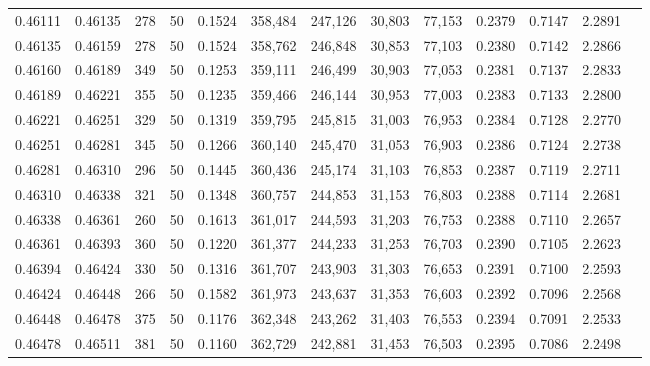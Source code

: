 \begin{tabular}{rrrrrrrrrrrrr}
0.46111 & 0.46135 &   278 &  50 &                                     0.1524 & 358,484 & 247,126 &  30,803 &  77,153 & 0.2379 & 0.7147 & 2.2891 \\
0.46135 & 0.46159 &   278 &  50 &                                     0.1524 & 358,762 & 246,848 &  30,853 &  77,103 & 0.2380 & 0.7142 & 2.2866 \\
0.46160 & 0.46189 &   349 &  50 &                                     0.1253 & 359,111 & 246,499 &  30,903 &  77,053 & 0.2381 & 0.7137 & 2.2833 \\
0.46189 & 0.46221 &   355 &  50 &                                     0.1235 & 359,466 & 246,144 &  30,953 &  77,003 & 0.2383 & 0.7133 & 2.2800 \\
0.46221 & 0.46251 &   329 &  50 &                                     0.1319 & 359,795 & 245,815 &  31,003 &  76,953 & 0.2384 & 0.7128 & 2.2770 \\
0.46251 & 0.46281 &   345 &  50 &                                     0.1266 & 360,140 & 245,470 &  31,053 &  76,903 & 0.2386 & 0.7124 & 2.2738 \\
0.46281 & 0.46310 &   296 &  50 &                                     0.1445 & 360,436 & 245,174 &  31,103 &  76,853 & 0.2387 & 0.7119 & 2.2711 \\
0.46310 & 0.46338 &   321 &  50 &                                     0.1348 & 360,757 & 244,853 &  31,153 &  76,803 & 0.2388 & 0.7114 & 2.2681 \\
0.46338 & 0.46361 &   260 &  50 &                                     0.1613 & 361,017 & 244,593 &  31,203 &  76,753 & 0.2388 & 0.7110 & 2.2657 \\
0.46361 & 0.46393 &   360 &  50 &                                     0.1220 & 361,377 & 244,233 &  31,253 &  76,703 & 0.2390 & 0.7105 & 2.2623 \\
0.46394 & 0.46424 &   330 &  50 &                                     0.1316 & 361,707 & 243,903 &  31,303 &  76,653 & 0.2391 & 0.7100 & 2.2593 \\
0.46424 & 0.46448 &   266 &  50 &                                     0.1582 & 361,973 & 243,637 &  31,353 &  76,603 & 0.2392 & 0.7096 & 2.2568 \\
0.46448 & 0.46478 &   375 &  50 &                                     0.1176 & 362,348 & 243,262 &  31,403 &  76,553 & 0.2394 & 0.7091 & 2.2533 \\
0.46478 & 0.46511 &   381 &  50 &                                     0.1160 & 362,729 & 242,881 &  31,453 &  76,503 & 0.2395 & 0.7086 & 2.2498 \\

\end{tabular}
